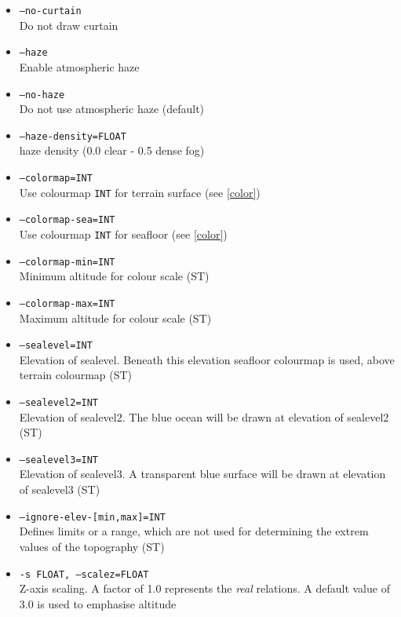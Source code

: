 \begin{itemize}
\item \texttt{--no-curtain} \\
Do not draw curtain

\item \texttt{--haze} \\
Enable atmospheric haze

\item \texttt{--no-haze} \\
Do not use atmospheric  haze (default)

\item \texttt{--haze-density=FLOAT} \\
haze density (0.0 clear - 0.5 dense fog)

\item \texttt{--colormap=INT} \\
Use colourmap \texttt{INT} for terrain surface (see \ref{color})

\item \texttt{--colormap-sea=INT} \\
Use colourmap \texttt{INT} for seafloor (see \ref{color})

\item \texttt{--colormap-min=INT} \\
Minimum altitude for colour scale (ST)

\item \texttt{--colormap-max=INT} \\
Maximum altitude for colour scale (ST)

\item \texttt{--sealevel=INT} \\
Elevation of sealevel. Beneath this elevation seafloor colourmap is used, above terrain colourmap (ST)

\item \texttt{--sealevel2=INT} \\
Elevation of sealevel2. The blue ocean will be drawn at elevation of sealevel2 (ST)

\item \texttt{--sealevel3=INT} \\
Elevation of sealevel3. A transparent blue surface will be drawn at elevation of sealevel3 (ST)

\item \texttt{--ignore-elev-[min,max]=INT} \\
Defines limits or a range, which are not used for determining the extrem values of the topography (ST)

\item \texttt{-s FLOAT, --scalez=FLOAT} \\
Z-axis scaling. A factor of 1.0 represents the \emph{real} relations. A default value of 3.0 is used to emphasise altitude


\end{itemize}
